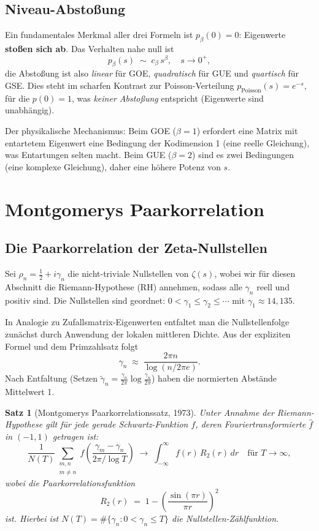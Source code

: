\documentclass[12pt,a4paper]{amsart}
\newtheorem{theorem}{Satz}[section]
\theoremstyle{definition}
\theoremstyle{remark}
\begin{document}
\subsection{Niveau-Abstoßung}

Ein fundamentales Merkmal aller drei Formeln ist $p_\beta(0) = 0$:
Eigenwerte \textbf{stoßen sich ab}. Das Verhalten nahe null ist
\[
  p_\beta(s) \;\sim\; c_\beta\, s^\beta, \quad s \to 0^+,
\]
die Abstoßung ist also \emph{linear} für GOE, \emph{quadratisch} für GUE
und \emph{quartisch} für GSE. Dies steht im scharfen Kontrast zur
Poisson-Verteilung $p_{\mathrm{Poisson}}(s) = e^{-s}$, für die $p(0) = 1$,
was \emph{keiner Abstoßung} entspricht (Eigenwerte sind unabhängig).

Der physikalische Mechanismus: Beim GOE ($\beta=1$) erfordert eine Matrix
mit entartetem Eigenwert eine Bedingung der Kodimension 1 (eine reelle
Gleichung), was Entartungen selten macht. Beim GUE ($\beta=2$) sind es zwei
Bedingungen (eine komplexe Gleichung), daher eine höhere Potenz von $s$.

\section{Montgomerys Paarkorrelation}
\label{sec:montgomery}

\subsection{Die Paarkorrelation der Zeta-Nullstellen}

Sei $\rho_n = \frac{1}{2} + i\gamma_n$ die nicht-triviale Nullstellen von
$\zeta(s)$, wobei wir für diesen Abschnitt die Riemann-Hypothese (RH)
annehmen, sodass alle $\gamma_n$ reell und positiv sind. Die Nullstellen
sind geordnet: $0 < \gamma_1 \leq \gamma_2 \leq \cdots$ mit
$\gamma_1 \approx 14{,}135$.

In Analogie zu Zufallsmatrix-Eigenwerten entfaltet man die Nullstellenfolge
zunächst durch Anwendung der lokalen mittleren Dichte. Aus der expliziten
Formel und dem Primzahlsatz folgt
\[
  \gamma_n \;\approx\; \frac{2\pi n}{\log(n/2\pi e)}.
\]
Nach Entfaltung (Setzen $\tilde{\gamma}_n = \frac{\gamma_n}{2\pi}\log\frac{\gamma_n}{2\pi}$)
haben die normierten Abstände Mittelwert 1.

\begin{theorem}[Montgomerys Paarkorrelationssatz, 1973]
\label{thm:montgomery}
Unter Annahme der Riemann-Hypothese gilt für jede gerade Schwartz-Funktion $f$,
deren Fouriertransformierte $\hat{f}$ in $(-1,1)$ getragen ist:
\[
  \frac{1}{N(T)}\sum_{\substack{m,n \\ m \neq n}} f\!\left(\frac{\gamma_m - \gamma_n}{2\pi/\log T}\right)
  \;\longrightarrow\;
  \int_{-\infty}^\infty f(r)\,R_2(r)\,dr \quad \text{für } T \to \infty,
\]
wobei die Paarkorrelationsfunktion
\[
  R_2(r) \;=\; 1 - \left(\frac{\sin(\pi r)}{\pi r}\right)^2
\]
ist. Hierbei ist $N(T) = \#\{\gamma_n : 0 < \gamma_n \leq T\}$ die Nullstellen-Zählfunktion.
\end{theorem}
\end{document}
